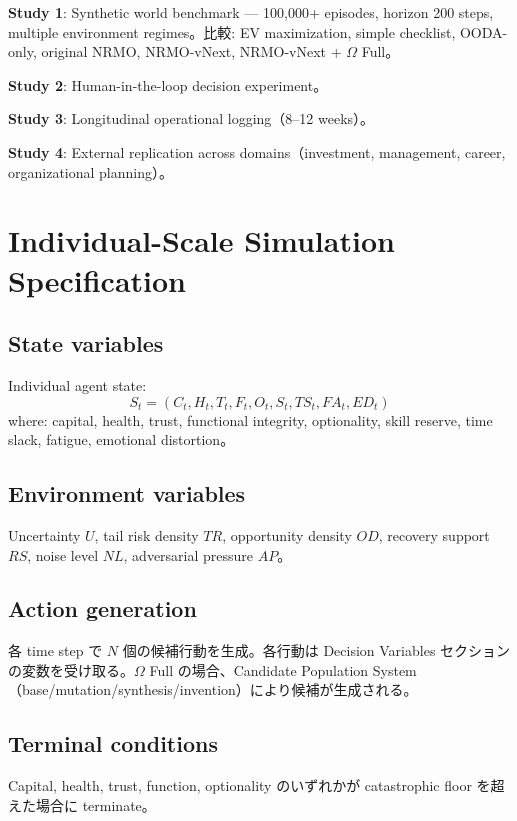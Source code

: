 \documentclass[11pt,a4paper]{article}
\theoremstyle{definition}\newtheorem{definition}{Definition}[section]
\begin{document}
\textbf{Study 1}: Synthetic world benchmark — 100,000+ episodes, horizon 200 steps, multiple environment regimes。比較: EV maximization, simple checklist, OODA-only, original NRMO, NRMO-vNext, NRMO-vNext + $\Omega$ Full。

\textbf{Study 2}: Human-in-the-loop decision experiment。

\textbf{Study 3}: Longitudinal operational logging（8--12 weeks）。

\textbf{Study 4}: External replication across domains（investment, management, career, organizational planning）。


\section{Individual-Scale Simulation Specification}

\subsection{State variables}
Individual agent state:
\begin{equation}
S_t = (C_t, H_t, T_t, F_t, O_t, S_t, TS_t, FA_t, ED_t)
\end{equation}
where: capital, health, trust, functional integrity, optionality, skill reserve, time slack, fatigue, emotional distortion。

\subsection{Environment variables}
Uncertainty $U$, tail risk density $TR$, opportunity density $OD$, recovery support $RS$, noise level $NL$, adversarial pressure $AP$。

\subsection{Action generation}
各 time step で $N$ 個の候補行動を生成。各行動は Decision Variables セクションの変数を受け取る。$\Omega$ Full の場合、Candidate Population System（base/mutation/synthesis/invention）により候補が生成される。

\subsection{Terminal conditions}
Capital, health, trust, function, optionality のいずれかが catastrophic floor を超えた場合に terminate。
\end{document}
